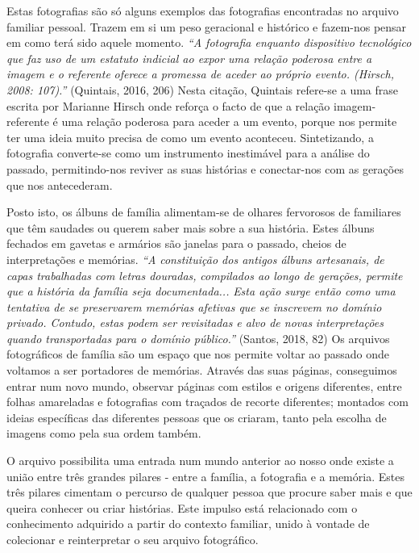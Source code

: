\documentclass{article}
\begin{document}
Estas fotografias são só alguns exemplos das fotografias encontradas no arquivo 
familiar pessoal. Trazem em si um peso geracional e histórico e fazem-nos pensar em 
como terá sido aquele momento. \textit{“A fotografia enquanto dispositivo tecnológico que faz }
\textit{uso de um estatuto indicial ao expor uma relação poderosa entre a imagem e o referente }
\textit{oferece a promessa de aceder ao próprio evento. (Hirsch, 2008: 107).”} (Quintais, 2016, 
206)  Nesta  citação,  Quintais  refere-se  a  uma  frase  escrita  por  Marianne  Hirsch  onde 
reforça o facto de que a relação imagem-referente é uma relação poderosa para aceder a 
um evento, porque nos permite ter uma ideia muito precisa de como um evento aconteceu. 
Sintetizando, a fotografia converte-se como um instrumento inestimável para a análise do 
passado, permitindo-nos reviver as suas histórias e conectar-nos com as gerações que nos 
antecederam. 
 
Posto isto, os álbuns de família alimentam-se de olhares fervorosos de familiares 
que têm saudades ou querem saber mais sobre a sua história. Estes álbuns fechados em 
gavetas e armários são janelas para o passado, cheios de interpretações e memórias. \textit{“A }
\textit{constituição dos antigos álbuns artesanais, de capas trabalhadas com letras douradas, }
\textit{compilados ao longo de gerações, permite que a história da família seja documentada... }
\textit{Esta ação surge então como uma tentativa de se preservarem memórias afetivas que se }
\textit{inscrevem  no  domínio  privado.  Contudo,  estas  podem  ser  revisitadas  e  alvo  de  novas }
\textit{interpretações  quando  transportadas  para  o  domínio  público.”}  (Santos,  2018,  82)  Os 
arquivos fotográficos de família são um espaço que nos permite voltar ao passado onde 
voltamos a ser portadores de memórias. Através das suas páginas, conseguimos entrar 
num  novo  mundo,  observar  páginas  com  estilos  e  origens  diferentes,  entre  folhas 
amareladas  e  fotografias  com  traçados  de  recorte  diferentes;  montados  com  ideias 
específicas das diferentes pessoas que os criaram, tanto pela escolha de imagens como 
pela sua ordem também. 
 
 
O arquivo possibilita uma entrada num mundo anterior ao nosso onde existe a 
união  entre  três  grandes  pilares  -  entre  a  família,  a  fotografia  e  a  memória.  Estes  três 
pilares  cimentam  o  percurso  de  qualquer  pessoa  que  procure  saber  mais  e  que  queira 
conhecer ou criar histórias. Este impulso está relacionado com o conhecimento adquirido 
a partir do contexto familiar, unido à vontade de colecionar e reinterpretar o seu arquivo 
fotográfico.
\end{document}
